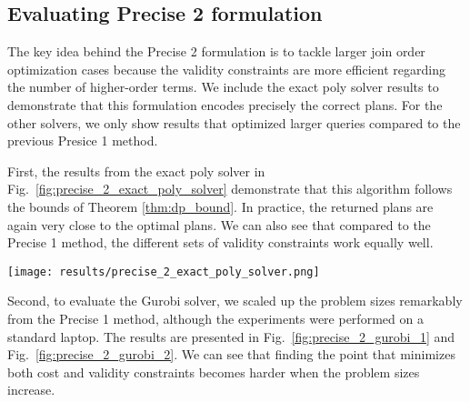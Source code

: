 \subsection{Evaluating \textrm{Precise 2} formulation}

The key idea behind the Precise 2 formulation is to tackle larger join order optimization cases because the validity constraints are more efficient regarding the number of higher-order terms. We include the exact poly solver results to demonstrate that this formulation encodes precisely the correct plans. For the other solvers, we only show results that optimized larger queries compared to the previous Presice 1 method.

First, the results from the exact poly solver in Fig.~\ref{fig:precise_2_exact_poly_solver} demonstrate that this algorithm follows the bounds of Theorem \ref{thm:dp_bound}. In practice, the returned plans are again very close to the optimal plans. We can also see that compared to the Precise 1 method, the different sets of validity constraints work equally well.

\begin{figure*}[tbh]
    \centering
    \texttt{[image: results/precise\_2\_exact\_poly\_solver.png]}
    \caption{Precise 2 results using the D-Wave's exact poly solver}
    \label{fig:precise_2_exact_poly_solver}
\end{figure*}


Second, to evaluate the Gurobi solver, we scaled up the problem sizes remarkably from the Precise 1 method, although the experiments were performed on a standard laptop. The results are presented in Fig.~\ref{fig:precise_2_gurobi_1} and Fig.~\ref{fig:precise_2_gurobi_2}. We can see that finding the point that minimizes both cost and validity constraints becomes harder when the problem sizes increase. %

